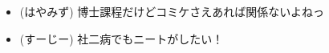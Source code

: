 
%
%

\begin{itemize}
 \item (はやみず) 博士課程だけどコミケさえあれば関係ないよねっ
 \item (すーじー) 社二病でもニートがしたい！
\end{itemize}
